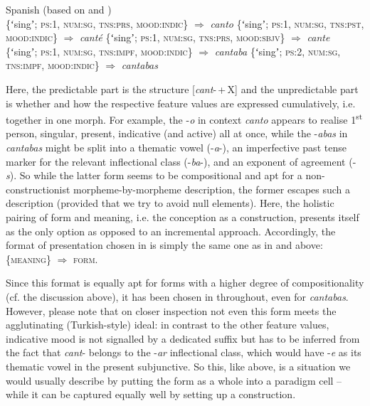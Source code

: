 \documentclass[output=paper]{langsci/langscibook}
\begin{document}
\ea \label{ex:reiner:4} 
{Spanish (based on \citealt[285]{Spencer2001} and \citealt[170--172]{ButtEtAl2019})}\\
\ea \{ʻsingʼ; \textsc{ps}:1, \textsc{num}:\textsc{sg}, \textsc{tns}:\textsc{prs}, \textsc{mood}:\textsc{indic}\} ${\Rightarrow}$ \textit{canto} \label{ex:reiner:4a}
\ex  \{ʻsingʼ; \textsc{ps}:1, \textsc{num}:\textsc{sg}, \textsc{tns}:\textsc{pst}, \textsc{mood}:\textsc{indic}\} ${\Rightarrow}$ \textit{canté} \label{ex:reiner:4b}
\ex  \{ʻsingʼ; \textsc{ps}:1, \textsc{num}:\textsc{sg}, \textsc{tns}:\textsc{prs}, \textsc{mood}:\textsc{sbjv}\} ${\Rightarrow}$ \textit{cante} \label{ex:reiner:4c}
\ex  \{ʻsingʼ; \textsc{ps}:1, \textsc{num}:\textsc{sg}, \textsc{tns}:\textsc{impf}, \textsc{mood}:\textsc{indic}\} ${\Rightarrow}$ \textit{cantaba} \label{ex:reiner:4d}
\ex  \{ʻsingʼ; \textsc{ps}:2, \textsc{num}:\textsc{sg}, \textsc{tns}:\textsc{impf}, \textsc{mood}:\textsc{indic}\} ${\Rightarrow}$ \textit{cantabas} \label{ex:reiner:4e}
\z \z

Here, the predictable part is the structure [\textit{cant}-\,+\,X] and the unpredictable part is whether and how the respective feature values are expressed cumulatively, i.e. together in one morph. For example, the -\textit{o} in context  \textit{canto} appears to realise 1\textsuperscript{st} person, singular, present, indicative (and active) all at once, while the -\textit{abas} in  \textit{cantabas} might be split into a thematic vowel (\nobreakdash-\textit{a}\nobreakdash-), an imperfective past tense marker for the relevant inflectional class (\nobreakdash-\textit{ba}\nobreakdash-), and an exponent of agreement (\nobreakdash-\textit{s}). So while the latter form seems to be compositional and apt for a non-constructionist morpheme-by-morpheme description, the former escapes such a description (provided that we try to avoid null elements). Here, the holistic pairing of form and meaning, i.e. the conception as a construction, presents itself as the only option as opposed to an incremental approach. Accordingly, the format of presentation chosen in  is simply the same one as in  and  above: \{\textsc{meaning}\} ${\Rightarrow}$ \textsc{form}.

Since this format is equally apt for forms with a higher degree of compositionality (cf. the discussion above), it has been chosen in  throughout, even for  \textit{cantabas}. However, please note that on closer inspection not even this form meets the agglutinating (Turkish-style) ideal: in contrast to the other feature values, indicative mood is not signalled by a dedicated suffix but has to be inferred from the fact that \textit{cant}{}- belongs to the -\textit{ar} inflectional class, which would have -\textit{e} as its thematic vowel in the present subjunctive. So this, like  above, is a situation we would usually describe by putting the form as a whole into a paradigm cell – while it can be captured equally well by setting up a construction.
\end{document}
